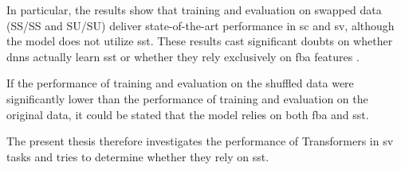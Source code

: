 In particular, the results show that training and evaluation on swapped data (SS/SS and SU/SU) deliver state-of-the-art performance in \gls{sc} and \gls{sv}, although the model does not utilize \gls{sst}. These results cast significant doubts on whether \glspl{dnn} actually learn \gls{sst} or whether they rely exclusively on \gls{fba} features \cite{neururer2023deep}.

If the performance of training and evaluation on the shuffled data were significantly lower than the performance of training and evaluation on the original data, it could be stated that the model relies on both \gls{fba} and \gls{sst}. 

The present thesis therefore investigates the performance of Transformers in \gls{sv} tasks and tries to determine whether they rely on \gls{sst}.

\newcommand{\OrigSeg}{OS}
\newcommand{\ShuffleSeg}{SS}
\newcommand{\ShuffleUtterance}{SU}

\newcommand{\markcell}[1]{\scriptsize{#1}$\Downarrow$\footnotesize}
\setlength{\tabcolsep}{2pt} %

